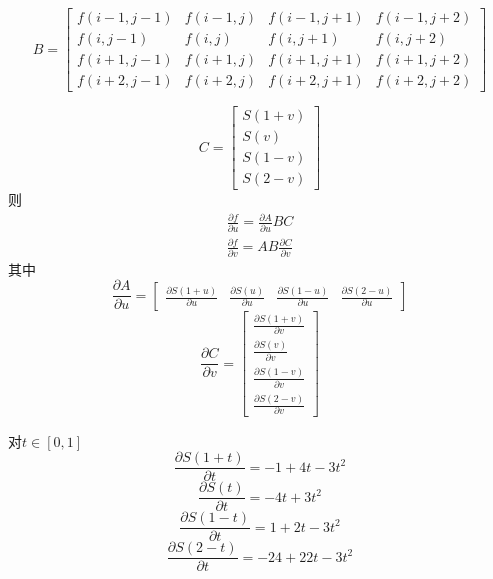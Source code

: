 \documentclass{article}
\begin{document}
\begin{equation}
	B=
	\begin{bmatrix} 
		f(i-1,j-1) & f(i-1,j) & f(i-1,j+1) & f(i-1,j+2)\\
		f(i,j-1) & f(i,j) & f(i,j+1) & f(i,j+2)\\
		f(i+1,j-1) & f(i+1,j) & f(i+1,j+1) & f(i+1,j+2)\\
		f(i+2,j-1) & f(i+2,j) & f(i+2,j+1) & f(i+2,j+2)
	\end{bmatrix}
\end{equation}

\begin{equation}
	C=
	\begin{bmatrix} 
		S(1+v) \\ S(v) \\ S(1-v) \\ S(2-v)
	\end{bmatrix}
\end{equation}
则
\begin{equation}
	\begin{aligned}
		\frac{\partial f}{\partial u} = \frac{\partial A}{\partial u}BC\\
		\frac{\partial f}{\partial v} = AB\frac{\partial C}{\partial v}
	\end{aligned}
\end{equation}
其中
\begin{equation}
	\frac{\partial A}{\partial u}=
	\begin{bmatrix} 
		\frac{\partial S(1+u)}{\partial u}  & \frac{\partial S(u)}{\partial u} & \frac{\partial S(1-u)}{\partial u} & \frac{\partial S(2-u)}{\partial u}
	\end{bmatrix}
\end{equation}
\begin{equation}
	\frac{\partial C}{\partial v}=
	\begin{bmatrix} 
		\frac{\partial S(1+v)}{\partial v} \\ \frac{\partial S(v)}{\partial v} \\ \frac{\partial S(1-v)}{\partial v} \\ \frac{\partial S(2-v)}{\partial v}
	\end{bmatrix}
\end{equation}

对$t\in[0,1]$
$$\frac{\partial S(1+t)}{\partial t} = -1 + 4t - 3t^2$$
$$\frac{\partial S(t)}{\partial t} = -4t + 3t^2$$
$$\frac{\partial S(1-t)}{\partial t} = 1 + 2t -3t^2$$
$$\frac{\partial S(2-t)}{\partial t} = -24 + 22t - 3t^2$$
\end{document}
